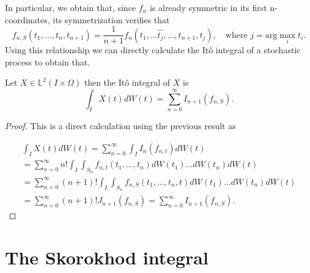 \documentclass[
    a4paper,
    DIV=14,
    abstract=true,
    numbers=noenddot
]{scrartcl}
\begin{document}
In particular, we obtain that, since $f_n$ is already symmetric in its first n-coordinates, its symmetrization verifies that
\begin{equation*}
	f_{n,S}(t_1,\ldots,t_n,t_{n+1})=\frac{1}{n+1}f_n(t_1,\ldots\hat{t_{j}},\ldots,t_{n+1},t_j),\quad \text{where } j=\text{arg}\max_i t_i.
\end{equation*}
Using this relationship we can directly calculate the Itô integral of a stochastic process to obtain that.
\begin{theorem}\label{itoskor}
	Let $X \in \mathbb{L}^2(I\times\Omega)$ then the Itô integral of $X$ is
	\begin{equation*}
		\int_{I} X(t) dW(t)=\sum_{n=0}^{\infty} I_{n+1}(f_{n,S}).
	\end{equation*}
\end{theorem}
\begin{proof}
	This is a direct calculation using the previous result as


	\begin{multline*}
		\int_{I} X(t) dW(t)=\sum_{n=0}^{\infty}\int_{I} I_n(f_{n,t})dW(t)\\=\sum_{n=0}^{\infty}n! \int_{I}\int_{S_n}f_{n,t}(t_1,\ldots,t_n) dW(t_1)\ldots dW(t_n) dW(t)\\=\sum_{n=0}^{\infty}(n+1)! \int_{I}\int_{S_n}f_{n,S}(t_1,\ldots,t_n,t) dW(t_1)\ldots dW(t_n) dW(t)\\=\sum_{n=0}^{\infty}(n+1)! J_{n+1}(f_{n,S}) =\sum_{n=0}^{\infty}  I_{n+1}(f_{n,S}).
	\end{multline*}

\end{proof}
\section{The Skorokhod integral}%
\end{document}
